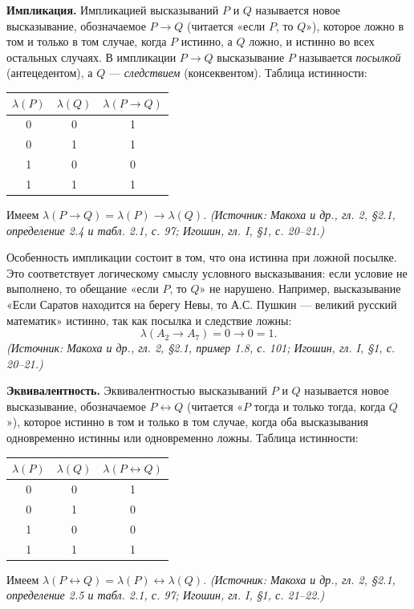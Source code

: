 \documentclass[a4paper,12pt]{article}
\begin{document}
\textbf{Импликация.} Импликацией высказываний \(P\) и \(Q\) называется новое высказывание, обозначаемое \(P\to Q\) (читается «если \(P\), то \(Q\)»), которое ложно в том и только в том случае, когда \(P\) истинно, а \(Q\) ложно, и истинно во всех остальных случаях. В импликации \(P\to Q\) высказывание \(P\) называется \emph{посылкой} (антецедентом), а \(Q\) — \emph{следствием} (консеквентом). Таблица истинности:
\begin{center}
\begin{tabular}{cc|c}
\toprule
\(\lambda(P)\) & \(\lambda(Q)\) & \(\lambda(P\to Q)\)\\
\midrule
0 & 0 & 1\\
0 & 1 & 1\\
1 & 0 & 0\\
1 & 1 & 1\\
\bottomrule
\end{tabular}
\end{center}
Имеем \(\lambda(P\to Q)=\lambda(P)\to\lambda(Q)\).
\textit{(Источник: Макоха и др., гл. 2, §2.1, определение 2.4 и табл. 2.1, с. 97; Игошин, гл. I, §1, с. 20--21.)}

Особенность импликации состоит в том, что она истинна при ложной посылке. Это соответствует логическому смыслу условного высказывания: если условие не выполнено, то обещание «если \(P\), то \(Q\)» не нарушено. Например, высказывание «Если Саратов находится на берегу Невы, то А.С. Пушкин — великий русский математик» истинно, так как посылка и следствие ложны:
\[
\lambda(A_2\to A_7)=0\to 0=1.
\]
\textit{(Источник: Макоха и др., гл. 2, §2.1, пример 1.8, с. 101; Игошин, гл. I, §1, с. 20--21.)}

\textbf{Эквивалентность.} Эквивалентностью высказываний \(P\) и \(Q\) называется новое высказывание, обозначаемое \(P\leftrightarrow Q\) (читается «\(P\) тогда и только тогда, когда \(Q\)»), которое истинно в том и только в том случае, когда оба высказывания одновременно истинны или одновременно ложны. Таблица истинности:
\begin{center}
\begin{tabular}{cc|c}
\toprule
\(\lambda(P)\) & \(\lambda(Q)\) & \(\lambda(P\leftrightarrow Q)\)\\
\midrule
0 & 0 & 1\\
0 & 1 & 0\\
1 & 0 & 0\\
1 & 1 & 1\\
\bottomrule
\end{tabular}
\end{center}
Имеем \(\lambda(P\leftrightarrow Q)=\lambda(P)\leftrightarrow\lambda(Q)\).
\textit{(Источник: Макоха и др., гл. 2, §2.1, определение 2.5 и табл. 2.1, с. 97; Игошин, гл. I, §1, с. 21--22.)}
\end{document}
